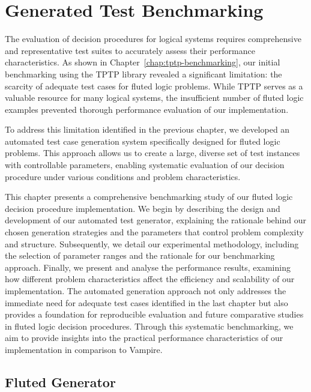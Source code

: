 \chapter{Generated Test Benchmarking}\label{chap:generated-benchmarking}
The evaluation of decision procedures for logical systems requires comprehensive and representative test suites to accurately assess their performance characteristics.
As shown in Chapter~\ref{chap:tptp-benchmarking}, our initial benchmarking using the TPTP library revealed a significant limitation: the scarcity of adequate test cases for fluted logic problems.
While TPTP serves as a valuable resource for many logical systems, the insufficient number of fluted logic examples prevented thorough performance evaluation of our implementation.

To address this limitation identified in the previous chapter, we developed an automated test case generation system specifically designed for fluted logic problems.
This approach allows us to create a large, diverse set of test instances with controllable parameters, enabling systematic evaluation of our decision procedure under various conditions and problem characteristics.

This chapter presents a comprehensive benchmarking study of our fluted logic decision procedure implementation.
We begin by describing the design and development of our automated test generator, explaining the rationale behind our chosen generation strategies and the parameters that control problem complexity and structure.
Subsequently, we detail our experimental methodology, including the selection of parameter ranges and the rationale for our benchmarking approach.
Finally, we present and analyse the performance results, examining how different problem characteristics affect the efficiency and scalability of our implementation.
The automated generation approach not only addresses the immediate need for adequate test cases identified in the last chapter but also provides a foundation for reproducible evaluation and future comparative studies in fluted logic decision procedures.
Through this systematic benchmarking, we aim to provide insights into the practical performance characteristics of our implementation in comparison to Vampire.
\section{Fluted Generator}\label{sec:fluted-generator}


